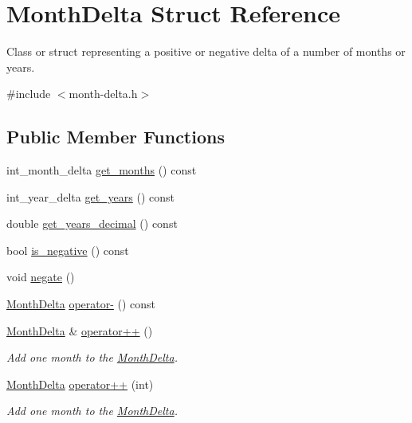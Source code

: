 \hypertarget{structMonthDelta}{\section{\-Month\-Delta \-Struct \-Reference}
\label{structMonthDelta}
}


\-Class or struct representing a positive or negative delta of a number of months or years.  




{\ttfamily \#include $<$month-\/delta.\-h$>$}

\subsection*{\-Public \-Member \-Functions}
\begin{DoxyCompactItemize}
\item 
int\-\_\-month\-\_\-delta \hyperlink{structMonthDelta_a2359cd00364588c01724c71b223faeec}{get\-\_\-months} () const 
\item 
int\-\_\-year\-\_\-delta \hyperlink{structMonthDelta_a6e0788916adc59ac112d1f64cb42084d}{get\-\_\-years} () const 
\item 
double \hyperlink{structMonthDelta_abe185d4ea3e055f8eacab3077fbda465}{get\-\_\-years\-\_\-decimal} () const 
\item 
bool \hyperlink{structMonthDelta_a4f0b4051d92cd180ac5f9f7466a36f57}{is\-\_\-negative} () const 
\item 
void \hyperlink{structMonthDelta_a88f17c6793e3e48ac00a70e12b9045d3}{negate} ()
\item 
\hyperlink{structMonthDelta}{\-Month\-Delta} \hyperlink{structMonthDelta_a5d754349cccfb68c729461b7a96d666f}{operator-\/} () const 
\item 
\hyperlink{structMonthDelta}{\-Month\-Delta} \& \hyperlink{structMonthDelta_a2d925db7f08eb18d1dcd4961d8149b48}{operator++} ()
\begin{DoxyCompactList}\small\item\em \-Add one month to the \hyperlink{structMonthDelta}{\-Month\-Delta}. \end{DoxyCompactList}\item 
\hyperlink{structMonthDelta}{\-Month\-Delta} \hyperlink{structMonthDelta_afcbef7f90cde7cf06a312da4acd5a1b9}{operator++} (int)
\begin{DoxyCompactList}\small\item\em \-Add one month to the \hyperlink{structMonthDelta}{\-Month\-Delta}. \end{DoxyCompactList}\item 

\end{DoxyCompactItemize}
